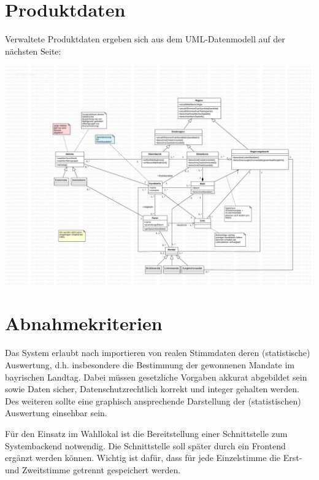 \documentclass[a4paper,12pt]{article}
\begin{document}
\section{Produktdaten}
Verwaltete Produktdaten ergeben sich aus dem UML-Datenmodell auf der nächsten Seite:

\begin{center}
	\includegraphics[width=\textwidth]{../model.pdf}
\end{center}

\section{Abnahmekriterien}
Das System erlaubt nach importieren von realen Stimmdaten deren (statistische) Auswertung, d.h. 
insbesondere die Bestimmung der gewonnenen Mandate im bayrischen Landtag. Dabei müssen gesetzliche
Vorgaben akkurat abgebildet sein sowie Daten sicher, Datenschutzrechtlich korrekt und integer gehalten
werden. Des weiteren sollte eine graphisch ansprechende Darstellung der (statistischen) Auswertung
einsehbar sein. 

Für den Einsatz im Wahllokal ist die Bereitstellung einer Schnittstelle zum Systembackend notwendig. Die Schnittstelle soll später durch ein Frontend ergänzt werden können. Wichtig ist dafür, dass für jede Einzelstimme die Erst- und Zweitstimme getrennt gespeichert werden. 


%  
\end{document}
